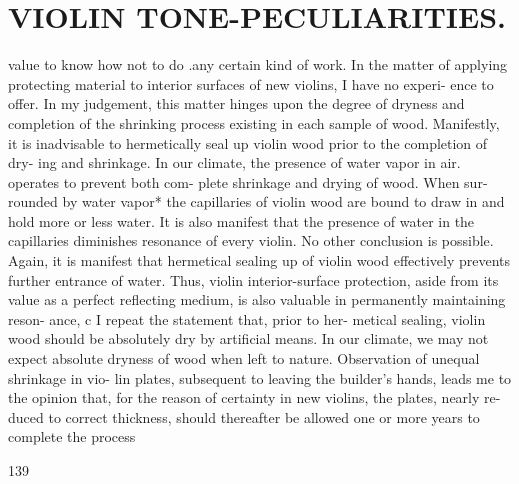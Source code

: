 \documentclass{article}
\begin{document}
\section*{VIOLIN TONE-PECULIARITIES.}
value to know how not to do .any certain kind of work. In the matter of applying protecting material to interior surfaces of new violins, I have no experi- ence to offer. In my judgement, this matter hinges upon the degree of dryness and completion of the shrinking process existing in each sample of wood. Manifestly, it is inadvisable to hermetically seal up violin wood prior to the completion of dry- ing and shrinkage. In our climate, the presence of water vapor in air. operates to prevent both com- plete shrinkage and drying of wood. When sur- rounded by water vapor* the capillaries of violin wood are bound to draw in and hold more or less water. It is also manifest that the presence of water in the capillaries diminishes resonance of every violin. No other conclusion is possible. Again, it is manifest that hermetical sealing up of violin wood effectively prevents further entrance of water. Thus, violin interior-surface protection, aside from its value as a perfect reflecting medium, is also valuable in permanently maintaining reson- ance, c I repeat the statement that, prior to her- metical sealing, violin wood should be absolutely dry by artificial means. In our climate, we may not expect absolute dryness of wood when left to nature. Observation of unequal shrinkage in vio- lin plates, subsequent to leaving the builder's hands, leads me to the opinion that, for the reason of certainty in new violins, the plates, nearly re- duced to correct thickness, should thereafter be allowed one or more years to complete the process

139
\end{document}
